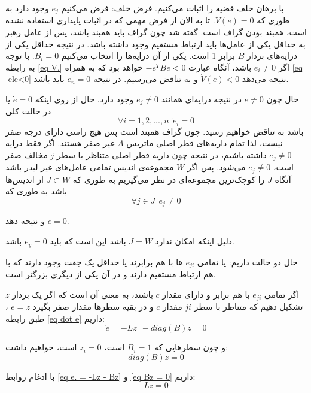با برهان خلف قضیه را اثبات می‌کنیم. فرض خلف: فرض می‌کنیم $e_j$ وجود دارد به ظوری که 
$\dot{V}(e) = 0$.
تا به الان از فرض مهمی که در اثبات پایداری استفاده نشده است، همبند بودن گراف است. گفته شد چون گراف باید همبند باشد، پس از عامل رهبر به حداقل یکی از عامل‌ها باید ارتباط مستقیم وجود داشته باشد. در نتیجه حداقل یکی از درایه‌های بردار $B$ برابر 1 است. یکی از آن درایه‌ها را انتخاب می‌کنیم 
$B_i = 0$.
با توجه به رابطه \ref{eq V.} اگر $e_i \ne 0$ باشد، آنگاه عبارت 
$-e^TBe < 0$
خواهد بود که به همراه \ref{eq -ele<0} نتیجه می‌دهد 
$\dot{V}(e) < 0$ 
و به تناقض می‌رسیم. در نتیجه 
$e_n = 0$
باید باشد.

حال چون 
$e \ne 0$
در نتیجه درایه‌ای همانند   
$e_j \ne 0$ 
وجود دارد. حال از روی اینکه 
$\dot{e} = 0$ 
یا در حالت کلی 
\begin{equation}
\forall i = 1,2,...,n ~~ \dot{e}_i = 0
\end{equation}
باشد به تناقض خواهیم رسید. چون گراف همبند است پس هیچ راسی دارای درجه صفر نیست، لذا تمام داریه‌های قطر اصلی ماتریس $A$ غیر صفر هستند. اگر فقط درایه 
$e_j \ne 0$
داشته باشیم، در نتیجه چون داریه قطر اصلی متناظر با سطر $j$ مخالف صفر است، 
$\dot{e}_j \ne 0$
می‌شود. پس اگر $W$ مجموعه‌ی اندیس تمامی عامل‌های غیر لیدر باشد آنگاه $J$ را کوچک‌ترین مجموعه‌ای در نظر می‌گیریم به طوری که  
$J \subset W $
 از اندیس‌ها باشد به طوری که 
\begin{equation}
	\forall j \in J~~ e_j \ne 0
\end{equation}

و نتیجه دهد 
$\dot{e} = 0$.

دلیل اینکه امکان ندارد 
$J = W$
باشد این است که باید
$e_y = 0$
باشد.

حال دو حالت داریم: یا تمامی $e_{ji}$ ها با هم برابرند یا حداقل یک جفت وجود دارند که با هم ارتباط مستقیم دارند و در آن یکی از دیگری بزرگتر است.

اگر تمامی $e_{ji}$ با هم برابر و دارای مقدار $c$ باشند، به معنی آن است که اگر یک بردار $z$ تشکیل دهیم که متناظر با سطر $ji$ مقدار $c$ و در بقیه سطرها مقدار صفر بگیرد
$e = z$
، طبق رابطه \ref{eq dot e} داریم:
\begin{equation}\label{eq e. = -Lz - Bz}
	\dot{e} = -Lz~~-diag(B)z = 0
\end{equation}

و چون سطرهایی که $B_i = 1$ است، 
$z_i = 0$
است، خواهیم داشت:
\begin{equation}\label{eq Bz = 0}
	diag(B)z = 0
\end{equation}

با ادغام روابط \ref{eq e. = -Lz - Bz} و \ref{eq Bz = 0} داریم:
\begin{equation}
	Lz = 0
\end{equation}

